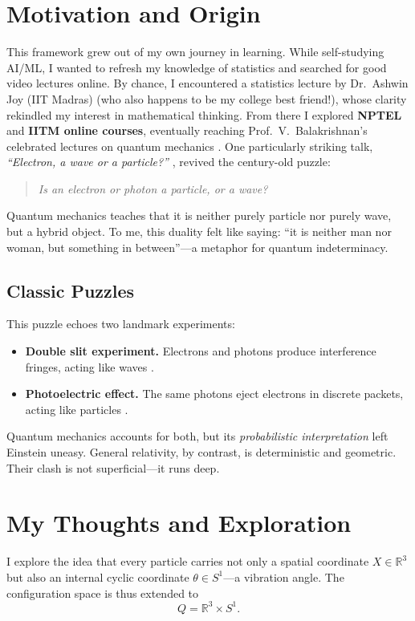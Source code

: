 \section{Motivation and Origin}
This framework grew out of my own journey in learning. While self-studying AI/ML, I
wanted to refresh my knowledge of statistics and searched for good video lectures online.
By chance, I encountered a statistics lecture by Dr.~Ashwin Joy (IIT Madras)
\cite{ashwinjoy_youtube} (who also happens to be my college best friend!), whose clarity rekindled my interest in mathematical thinking.
From there I explored \textbf{NPTEL} and \textbf{IITM online courses}, eventually reaching
Prof.~V.~Balakrishnan’s celebrated lectures on quantum mechanics
\cite{balakrishnan_qm_series}.
One particularly striking talk, \emph{``Electron, a wave or a particle?''}
\cite{balakrishnan_wave_particle}, revived the century-old puzzle:
\begin{quote}
\emph{Is an electron or photon a particle, or a wave?}
\end{quote}
Quantum mechanics teaches that it is neither purely particle nor purely wave, but a
hybrid object. To me, this duality felt like saying: ``it is neither man nor woman, but
something in between''---a metaphor for quantum indeterminacy.

\subsection{Classic Puzzles}
This puzzle echoes two landmark experiments:
\begin{itemize}
  \item \textbf{Double slit experiment.} Electrons and photons produce interference fringes,
        acting like waves \cite{feynman_double_slit}.
  \item \textbf{Photoelectric effect.} The same photons eject electrons in discrete packets,
        acting like particles \cite{einstein_nobel}.
\end{itemize}
Quantum mechanics accounts for both, but its \emph{probabilistic interpretation} left
Einstein uneasy. General relativity, by contrast, is deterministic and geometric. Their
clash is not superficial---it runs deep.

\section{My Thoughts and Exploration}
I explore the idea that every particle carries not only a spatial coordinate
$X \in \mathbb{R}^3$ but also an internal cyclic coordinate $\theta \in S^1$---a vibration
angle. The configuration space is thus extended to
\[
Q = \mathbb{R}^3 \times S^1.
\]

